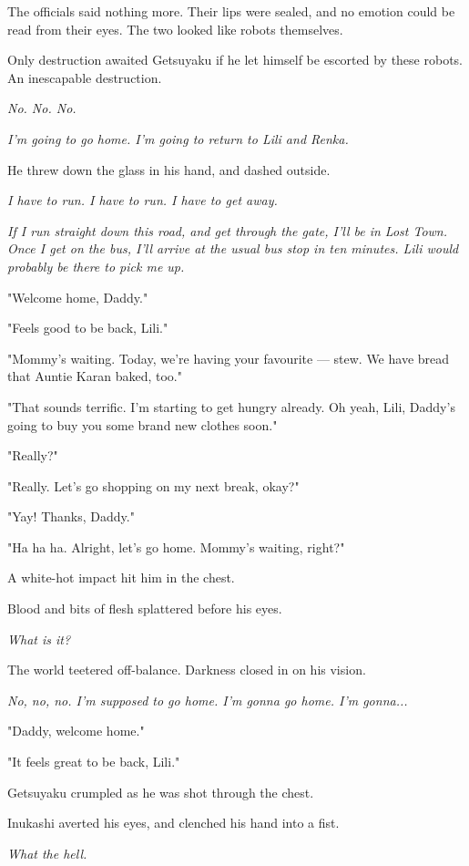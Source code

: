 The officials said nothing more. Their lips were sealed, and no emotion
could be read from their eyes. The two looked like robots themselves.

Only destruction awaited Getsuyaku if he let himself be escorted by
these robots. An inescapable destruction.

\emph{No. No. No.}

\emph{I'm going to go home. I'm going to return to Lili and Renka.}

He threw down the glass in his hand, and dashed outside.

\emph{I have to run. I have to run. I have to get away.}

\emph{If I run straight down this road, and get through the gate, I'll be in
Lost Town. Once I get on the bus, I'll arrive at the usual bus stop in
ten minutes. Lili would probably be there to pick me up.}

"Welcome home, Daddy."

"Feels good to be back, Lili."

"Mommy's waiting. Today, we're having your favourite --- stew. We have
bread that Auntie Karan baked, too."

"That sounds terrific. I'm starting to get hungry already. Oh yeah,
Lili, Daddy's going to buy you some brand new clothes soon."

"Really?"

"Really. Let's go shopping on my next break, okay?"

"Yay! Thanks, Daddy."

"Ha ha ha. Alright, let's go home. Mommy's waiting, right?"

A white-hot impact hit him in the chest.

Blood and bits of flesh splattered before his eyes.

\emph{What is it?}

The world teetered off-balance. Darkness closed in on his vision.

\emph{No, no, no. I'm supposed to go home. I'm gonna go home. I'm gonna...}

"Daddy, welcome home."

"It feels great to be back, Lili."

Getsuyaku crumpled as he was shot through the chest.

\myspace

Inukashi averted his eyes, and clenched his hand into a fist.

\emph{What the hell.}

